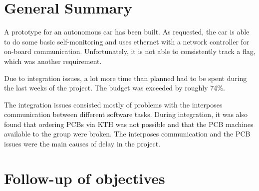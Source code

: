\documentclass[11pt, titlepage]{article} %
\begin{document}
\begin{titlepage}
	
	 
	
	\vfill %
	
\end{titlepage}


\clearpage

\section{General Summary}
A prototype for an autonomous car has been built. As requested, the car is able to
do some basic self-monitoring and uses ethernet with a network controller for on-board
communication. Unfortunately, it is not able to consistently track a flag, which was
another requirement.

Due to integration issues, a lot more time than planned had to be spent during the
last weeks of the project. The budget was exceeded by roughly 74\%.

The integration issues consisted mostly of problems with the interposes communication
between different software tasks. During integration, it was also found that ordering
PCBs via KTH was not possible and that the PCB machines available to the group were broken.
The interposes communication and the PCB issues were the main causes of delay in the
project.

\section{Follow-up of objectives}
\end{document}
